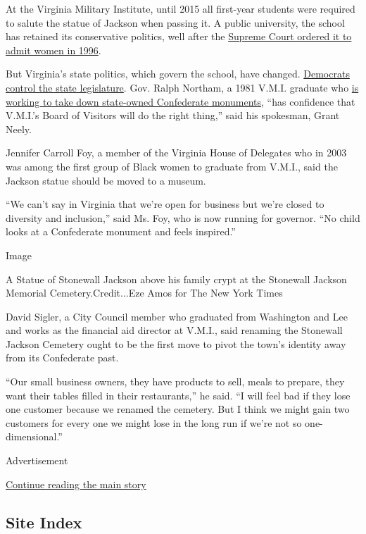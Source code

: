 At the Virginia Military Institute, until 2015 all first-year students
were required to salute the statue of Jackson when passing it. A public
university, the school has retained its conservative politics, well
after the
\href{https://www.nytimes.com/1996/09/22/us/defiant-vmi-to-admit-women-but-will-not-ease-rules-for-them.html}{Supreme
Court ordered it to admit women in 1996}.

But Virginia's state politics, which govern the school, have changed.
\href{https://www.nytimes.com/2019/11/05/us/politics/virginia-elections.html}{Democrats
control the state legislature}. Gov. Ralph Northam, a 1981 V.M.I.
graduate who
\href{https://www.nytimes.com/2020/06/03/us/robert-e-lee-statue-richmond.html}{is
working to take down state-owned Confederate monuments}, ``has
confidence that V.M.I.'s Board of Visitors will do the right thing,''
said his spokesman, Grant Neely.

Jennifer Carroll Foy, a member of the Virginia House of Delegates who in
2003 was among the first group of Black women to graduate from V.M.I.,
said the Jackson statue should be moved to a museum.

``We can't say in Virginia that we're open for business but we're closed
to diversity and inclusion,'' said Ms. Foy, who is now running for
governor. ``No child looks at a Confederate monument and feels
inspired.''

Image

A Statue of Stonewall Jackson above his family crypt at the Stonewall
Jackson Memorial Cemetery.Credit...Eze Amos for The New York Times

David Sigler, a City Council member who graduated from Washington and
Lee and works as the financial aid director at V.M.I., said renaming the
Stonewall Jackson Cemetery ought to be the first move to pivot the
town's identity away from its Confederate past.

``Our small business owners, they have products to sell, meals to
prepare, they want their tables filled in their restaurants,'' he said.
``I will feel bad if they lose one customer because we renamed the
cemetery. But I think we might gain two customers for every one we might
lose in the long run if we're not so one-dimensional.''

Advertisement

\protect\hyperlink{after-bottom}{Continue reading the main story}

\hypertarget{site-index}{%
\subsection{Site Index}\label{site-index}}

